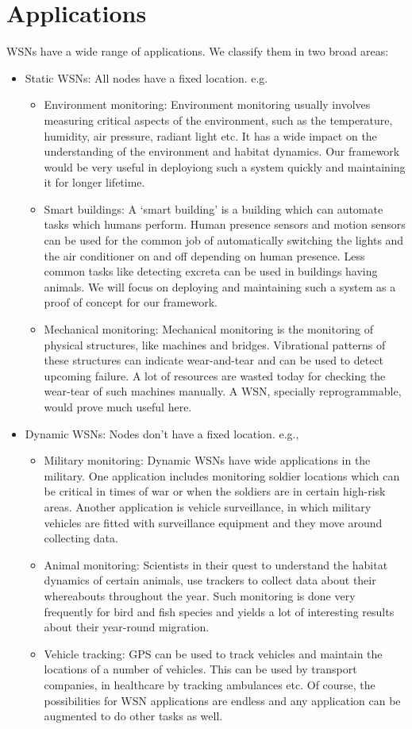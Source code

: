 \documentclass[twocolumn]{article}
\begin{document}
\section{Applications}
WSNs have a wide range of applications. We classify them in two broad areas:
\begin{itemize}
\item Static WSNs: All nodes have a fixed location. e.g.\,
\begin{itemize}
\item Environment monitoring: Environment monitoring usually involves measuring critical aspects of the environment, such as the temperature, humidity, air pressure, radiant light etc. It has a wide impact on the understanding of the environment and habitat dynamics. Our framework would be very useful in deployiong such a system quickly and maintaining it for longer lifetime.
\item Smart buildings: A `smart building' is a building which can automate tasks which humans perform. Human presence sensors and motion sensors can be used for the common job of automatically switching the lights and the air conditioner on and off depending on human presence. Less common tasks like detecting excreta can be used in buildings having animals. We will focus on deploying and maintaining such a system as a proof of concept for our framework.
\item Mechanical monitoring: Mechanical monitoring is the monitoring of physical structures, like machines and bridges. Vibrational patterns of these structures can indicate wear-and-tear and can be used to detect upcoming failure. A lot of resources are wasted today for checking the wear-tear of such machines manually. A WSN, specially reprogrammable, would prove much useful here.
\end{itemize}
\item Dynamic WSNs: Nodes don't have a fixed location. e.g.,\
\begin{itemize}
\item Military monitoring: Dynamic WSNs have wide applications in the military. One application includes monitoring soldier locations which can be critical in times of war or when the soldiers are in certain high-risk areas. Another application is vehicle surveillance, in which military vehicles are fitted with surveillance equipment and they move around collecting data.
\item Animal monitoring: Scientists in their quest to understand the habitat dynamics of certain animals, use trackers to collect data about their whereabouts throughout the year. Such monitoring is done very frequently for bird and fish species and yields a lot of interesting results about their year-round migration.
\item Vehicle tracking: GPS can be used to track vehicles and maintain the locations of a number of vehicles. This can be used by transport companies, in healthcare by tracking ambulances etc.
Of course, the possibilities for WSN applications are endless and any application can be augmented to do other tasks as well.
\end{itemize}
\end{itemize}
\end{document}
